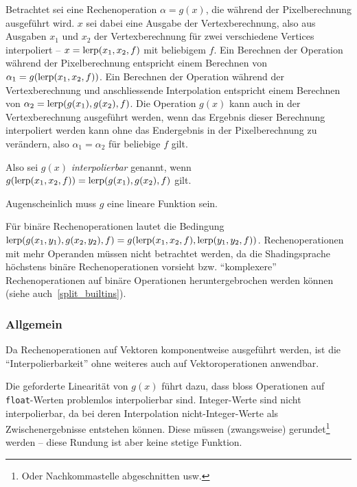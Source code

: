\documentclass[twoside,a4paper,fleqn,12pt]{book}
\newtheorem{defn}{Definition}
\begin{document}
Betrachtet sei eine Rechenoperation $\alpha = g(x)$, die während der Pixelberechnung ausgeführt wird.
$x$ sei dabei eine Ausgabe der Vertexberechnung, also aus Ausgaben $x_1$ und $x_2$ der Vertexberechnung für zwei verschiedene Vertices interpoliert -- $x = \mathrm{lerp}(x_1, x_2, f)$
mit beliebigem $f$. Ein Berechnen der Operation während der Pixelberechnung entspricht einem Berechnen von $\alpha_1 = g(\mathrm{lerp}(x_1, x_2, f))$.
Ein Berechnen der Operation während der Vertexberechnung und anschliessende Interpolation entspricht einem Berechnen von $\alpha_2 = \mathrm{lerp} (g(x_1), g(x_2), f)$.
Die Operation $g(x)$ kann auch in der Vertexberechnung ausgeführt werden, wenn das Ergebnis dieser Berechnung interpoliert werden kann ohne
das Endergebnis in der Pixelberechnung zu verändern, also $\alpha_1 = \alpha_2$ für beliebige $f$ gilt.

Also sei $g(x)$ \emph{interpolierbar} genannt, wenn $g(\mathrm{lerp}(x_1, x_2, f)) = \mathrm{lerp} (g(x_1), g(x_2), f)$ gilt. 

Augenscheinlich muss $g$ eine lineare Funktion sein.


Für binäre Rechenoperationen lautet die Bedingung $\mathrm{lerp} (g (x_1, y_1), g (x_2, y_2), f) = g (\mathrm{lerp} (x_1, x_2, f), \mathrm{lerp} (y_1, y_2, f))$.
Rechenoperationen mit mehr Operanden müssen nicht betrachtet werden, da die Shadingsprache höchstens
binäre Rechenoperationen vorsieht bzw. "`komplexere"' Rechenoperationen auf binäre Operationen heruntergebrochen werden
können (siehe auch~\ref{split_builtins}). %

\subsubsection{Allgemein}
Da Rechenoperationen auf Vektoren komponentweise ausgeführt werden,  ist die "`Interpolierbarkeit"' ohne weiteres auch auf Vektoroperationen anwendbar.

Die geforderte Linearität von $g(x)$ führt dazu, dass bloss Operationen auf \texttt{float}-Werten problemlos interpolierbar sind.
Integer-Werte sind nicht interpolierbar, da bei deren Interpolation nicht-Integer-Werte als Zwischenergebnisse entstehen können.
Diese müssen (zwangsweise) gerundet\footnote{Oder Nachkommastelle abgeschnitten usw.} werden -- diese Rundung
ist aber keine stetige Funktion.
\end{document}
